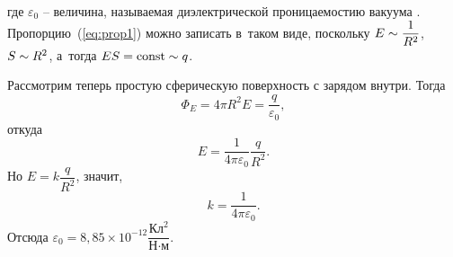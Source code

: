 	где $\varepsilon_0$ -- величина, называемая диэлектрической проницаемостию вакуума . Пропорцию~(\ref{eq:prop1}) можно записать в~таком виде, поскольку $E\sim\dfrac{1}{R^2}$, $S\sim R^2$, а~тогда $ES=\mathrm{const}\sim q$.\par
	Рассмотрим теперь простую сферическую поверхность  с зарядом внутри. Тогда
		$$\Phi_E=4\pi R^2 E=\frac{q}{\varepsilon_0},$$
	откуда
		$$E=\frac{1}{4\pi\varepsilon_0}\frac{q}{R^2}.$$
	Но $E=k\dfrac{q}{R^2}$, значит,
		\begin{equation}
			k=\frac{1}{4\pi\varepsilon_0}.
		\end{equation}
	Отсюда $\varepsilon_0=8,85\times 10^{-12} \dfrac{\text{Кл}^2}{\text{Н}\cdot\text{м}}$.